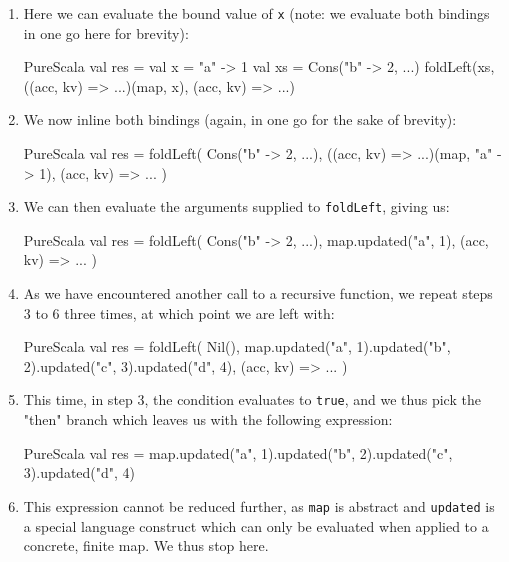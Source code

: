 \documentclass[a4paper,twoside]{article}
\newcommand{\stt}[1]{\texttt{\small{#1}}}
\begin{document}
\begin{enumerate}
\begin{ShortCode}{PureScala}
val res = {
  val x  = Cons("a" -> 1, Cons("b" -> 2, ...)).asInstanceOf[Cons[A]].head
  val xs = Cons("a" -> 1, Cons("b" -> 2, ...)).asInstanceOf[Cons[A]].tail
  foldLeft(xs, ((acc, kv) => ...)(map, x), (acc, kv) => ...)
}
\end{ShortCode}

\item Here we can evaluate the bound value of \stt{x} (note: we evaluate both bindings in one go here for brevity):

\begin{ShortCode}{PureScala}
val res = {
  val x  = "a" -> 1
  val xs = Cons("b" -> 2, ...)
  foldLeft(xs, ((acc, kv) => ...)(map, x), (acc, kv) => ...)
}
\end{ShortCode}

\item We now inline both bindings (again, in one go for the sake of brevity):

\begin{ShortCode}{PureScala}
val res = {
  foldLeft(
    Cons("b" -> 2, ...),
    ((acc, kv) => ...)(map, "a" -> 1),
    (acc, kv) => ...
  )
}
\end{ShortCode}

\item We can then evaluate the arguments supplied to \stt{foldLeft}, giving us:

\begin{ShortCode}{PureScala}
val res = {
  foldLeft(
    Cons("b" -> 2, ...),
    map.updated("a", 1),
    (acc, kv) => ...
  )
}
\end{ShortCode}

\item As we have encountered another call to a recursive function, we repeat steps 3 to 6 three times, at which point we are left with:

\begin{ShortCode}{PureScala}
val res = {
  foldLeft(
    Nil(),
    map.updated("a", 1).updated("b", 2).updated("c", 3).updated("d", 4),
    (acc, kv) => ...
  )
}
\end{ShortCode}

\item This time, in step 3, the condition evaluates to \stt{true}, and we thus pick the "then" branch which leaves us with the following expression:

\begin{ShortCode}{PureScala}
val res = map.updated("a", 1).updated("b", 2).updated("c", 3).updated("d", 4)
\end{ShortCode}

\item This expression cannot be reduced further, as \stt{map} is abstract and \stt{updated} is a special language construct which can only be evaluated when applied to a concrete, finite map. We thus stop here.

\end{enumerate}
\end{document}
